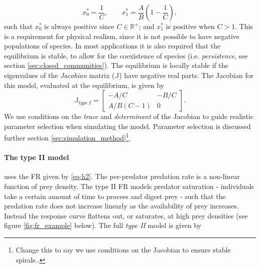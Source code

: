 \begin{equation}\label{eq:lin_mod_eq}
x_{0}^{*} = \frac{1}{C}, 
\qquad
x_{1}^{*} = \frac{A}{B}\left(1 - \frac{1}{C}\right) , 
\end{equation}
%
such that $x_0^*$ is always positive since $C \in \mathbb{R}^+$; and $x_1^*$ is positive when $C>1$. This is a requirement for physical realism, since it is not possible to have negative populations of species. In most applications it is also required that the equilibrium is stable, to allow for the coexistence of species (i.e. \emph{persistence}, see section \ref{sec:closed_communities}). The equilibrium is locally stable if the eigenvalues of the \emph{Jacobian} matrix ($\mathbb{J}$) have negative real parts. The Jacobian for this model, evaluated at the equilibrium, is given by
\begin{equation}\label{eq:jac2}
\mathbb{J}_{type\ I} = 
\begin{bmatrix}
-A/C & -B/C \\ A/B(C-1) & 0
\end{bmatrix}  	.
\end{equation}
%
We use conditions on the \emph{trace} and \emph{determinant} of the Jacobian to guide realistic parameter selection when simulating the model. Parameter selection is discussed further section \ref{sec:simulation_method}\footnote{Change this to say we use conditions on the Jacobian to ensure stable spirals..}. 


\paragraph*{The type II model} uses the FR given by \eqref{eq:h2}. The per-predator predation rate is a non-linear function of prey density. The type II FR models predator saturation - individuals take a certain amount of time to process and digest prey - such that the predation rate does not increase linearly as the availability of prey increases. Instead the response curve flattens out, or saturates, at high prey densities (see figure \ref{fig:fr_example} below). The full \emph{type II} model is given by

